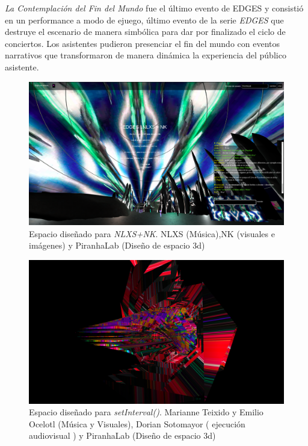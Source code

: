 \textit{La Contemplación del Fin del Mundo} fue el último evento de EDGES y consistió en un performance a modo de ejuego, último evento de la serie \textit{EDGES} que destruye el escenario de manera simbólica para dar por finalizado el ciclo de conciertos. Los asistentes pudieron presenciar el fin del mundo con eventos narrativos que transformaron de manera dinámica la experiencia del público asistente. 

\begin{figure}
  \includegraphics[width=\textwidth]{img/figura8.png}
  \caption{Espacio diseñado para \emph{NLXS+NK}. NLXS (Música),NK (visuales e imágenes) y PiranhaLab (Diseño de espacio 3d)}
  \label{fig:nlxs}
\end{figure}

\begin{figure}
  \includegraphics[width=\textwidth]{img/figura9.png}
  \caption{Espacio diseñado para \emph{setInterval()}. Marianne Teixido y Emilio Ocelotl (Música y Visuales), Dorian Sotomayor ( ejecución audiovisual ) y PiranhaLab (Diseño de espacio 3d) }
  \label{fig:set}
\end{figure}

